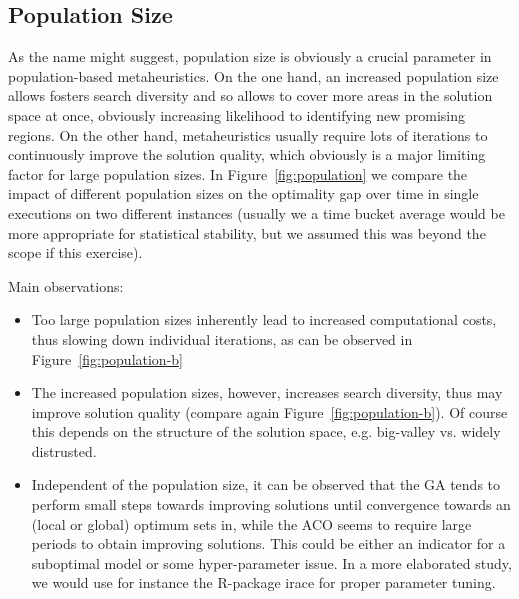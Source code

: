 \documentclass[12pt]{article}
\begin{document}
\subsection{Population Size}
As the name might suggest, population size is obviously a crucial parameter in population-based metaheuristics. On the one hand, an increased population size allows fosters search diversity and so allows to cover more areas in the solution space at once, obviously increasing likelihood to identifying new promising regions. On the other hand, metaheuristics usually require lots of iterations to continuously improve the solution quality, which obviously is a major limiting factor for large population sizes. In Figure~\ref{fig:population} we compare the impact of different population sizes on the optimality gap over time in single executions on two different instances (usually we a time bucket average would be more appropriate for statistical stability, but we assumed this was beyond the scope if this exercise).

Main observations:
\begin{itemize}
	\item Too large population sizes inherently lead to increased computational costs, thus slowing down individual iterations, as can be observed in Figure~\ref{fig:population-b}
	\item The increased population sizes, however, increases search diversity, thus may improve solution quality (compare again Figure~\ref{fig:population-b}). Of course this depends on the structure of the solution space, e.g. big-valley vs. widely distrusted.
	\item Independent of the population size, it can be observed that the GA tends to perform small steps towards improving solutions until convergence towards an (local or global) optimum sets in, while the ACO seems to require large periods to obtain improving solutions. This could be either an indicator for a suboptimal model or some hyper-parameter issue. In a more elaborated study, we would use for instance the R-package irace for proper parameter tuning. 
\end{itemize}
\end{document}
